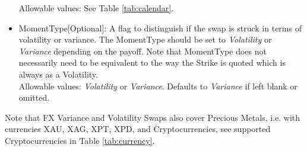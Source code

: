 \begin{itemize}
	Allowable values: See Table \ref{tab:calendar}.	
	\item MomentType[Optional]: A flag to distinguish if the swap is struck in terms of volatility or variance. The MomentType should be set to \emph{Volatility} or \emph{Variance} depending on the payoff.  Note that MomentType does not necessarily need to be equivalent to the way the Strike is quoted which is always as a Volatility.\\
	Allowable values: \emph{Volatility} or \emph{Variance}. Defaults to \emph{Variance} if left blank or omitted.
\end{itemize}

Note that FX Variance and Volatility Swaps also cover Precious Metals, i.e. with
currencies XAU, XAG, XPT, XPD, and Cryptocurrencies,  see supported Cryptocurrencies in Table \ref{tab:currency}.